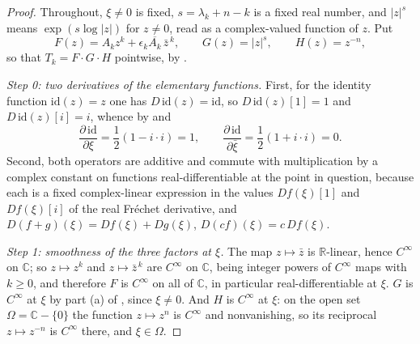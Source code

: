\begin{proof}
Throughout, $\xi\ne0$ is fixed, $s=\lambda_k+n-k$ is a fixed real number, and
$|z|^{s}$ means $\exp(s\log|z|)$ for $z\ne0$, read as a complex-valued
function of $z$.  Put
\[
  F(z)=A_kz^{k}+\epsilon_k\overline{A_k}\,\bar z^{\,k},\qquad
  G(z)=|z|^{s},\qquad
  H(z)=z^{-n},
\]
so that $T_k=F\cdot G\cdot H$ pointwise, by .

\emph{Step 0: two derivatives of the elementary functions.}  First, for the
identity function $\mathrm{id}(z)=z$ one has $D\,\mathrm{id}(z)=\mathrm{id}$,
so $D\,\mathrm{id}(z)[1]=1$ and $D\,\mathrm{id}(z)[i]=i$, whence by
 and 
\begin{equation}\tag{1}
  \frac{\partial\,\mathrm{id}}{\partial\xi}=\frac12(1-i\cdot i)=1,
  \qquad
  \frac{\partial\,\mathrm{id}}{\partial\bar\xi}=\frac12(1+i\cdot i)=0 .
\end{equation}
Second, both operators are additive and commute with multiplication by a
complex constant on functions real-differentiable at the point in question,
because each is a fixed complex-linear expression in the values
$Df(\xi)[1]$ and $Df(\xi)[i]$ of the real Fr\'echet derivative, and
$D(f+g)(\xi)=Df(\xi)+Dg(\xi)$, $D(cf)(\xi)=c\,Df(\xi)$.

\emph{Step 1: smoothness of the three factors at $\xi$.}  The map
$z\mapsto\bar z$ is $\mathbb{R}$-linear, hence $C^\infty$ on $\mathbb{C}$; so
$z\mapsto z^{k}$ and $z\mapsto\bar z^{\,k}$ are $C^\infty$ on $\mathbb{C}$,
being integer powers of $C^\infty$ maps with $k\ge0$, and therefore $F$ is
$C^\infty$ on all of $\mathbb{C}$, in particular real-differentiable at $\xi$.
$G$ is $C^\infty$ at $\xi$ by part (a) of ,
since $\xi\ne0$.  And $H$ is $C^\infty$ at $\xi$: on the open set
$\Omega=\mathbb{C}-\{0\}$ the function $z\mapsto z^{n}$ is $C^\infty$ and
nonvanishing, so its reciprocal $z\mapsto z^{-n}$ is $C^\infty$ there, and
$\xi\in\Omega$.


\end{proof}
